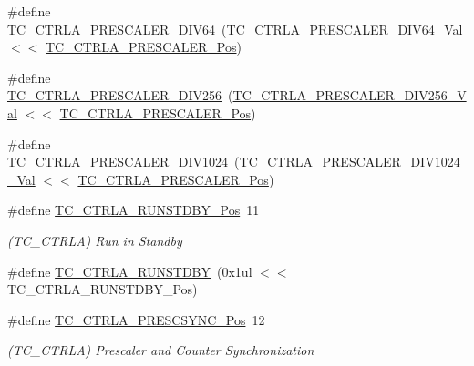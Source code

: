 \begin{DoxyCompactItemize}
\item 
\#define \mbox{\hyperlink{group___s_a_m_d21___t_c_gac90b5513f244124e999727b1380d40cc}{T\+C\+\_\+\+C\+T\+R\+L\+A\+\_\+\+P\+R\+E\+S\+C\+A\+L\+E\+R\+\_\+\+D\+I\+V64}}~(\mbox{\hyperlink{group___s_a_m_d21___t_c_ga0b0249d49985611866900d8e5f932543}{T\+C\+\_\+\+C\+T\+R\+L\+A\+\_\+\+P\+R\+E\+S\+C\+A\+L\+E\+R\+\_\+\+D\+I\+V64\+\_\+\+Val}}  $<$$<$ \mbox{\hyperlink{group___s_a_m_d21___t_c_ga99d3a0239aaa0aecd6d8bec41fd4ce05}{T\+C\+\_\+\+C\+T\+R\+L\+A\+\_\+\+P\+R\+E\+S\+C\+A\+L\+E\+R\+\_\+\+Pos}})
\item 
\#define \mbox{\hyperlink{group___s_a_m_d21___t_c_gab0b9cb13e0e2fd7136b258033cd1ffb6}{T\+C\+\_\+\+C\+T\+R\+L\+A\+\_\+\+P\+R\+E\+S\+C\+A\+L\+E\+R\+\_\+\+D\+I\+V256}}~(\mbox{\hyperlink{group___s_a_m_d21___t_c_gadb32efea52586bd45507d5988fa89452}{T\+C\+\_\+\+C\+T\+R\+L\+A\+\_\+\+P\+R\+E\+S\+C\+A\+L\+E\+R\+\_\+\+D\+I\+V256\+\_\+\+Val}} $<$$<$ \mbox{\hyperlink{group___s_a_m_d21___t_c_ga99d3a0239aaa0aecd6d8bec41fd4ce05}{T\+C\+\_\+\+C\+T\+R\+L\+A\+\_\+\+P\+R\+E\+S\+C\+A\+L\+E\+R\+\_\+\+Pos}})
\item 
\#define \mbox{\hyperlink{group___s_a_m_d21___t_c_ga64129a9b91628fd9ae8da421e9a5ba46}{T\+C\+\_\+\+C\+T\+R\+L\+A\+\_\+\+P\+R\+E\+S\+C\+A\+L\+E\+R\+\_\+\+D\+I\+V1024}}~(\mbox{\hyperlink{group___s_a_m_d21___t_c_ga4bf804edc81bb01e9fc5cc9c7b365d86}{T\+C\+\_\+\+C\+T\+R\+L\+A\+\_\+\+P\+R\+E\+S\+C\+A\+L\+E\+R\+\_\+\+D\+I\+V1024\+\_\+\+Val}} $<$$<$ \mbox{\hyperlink{group___s_a_m_d21___t_c_ga99d3a0239aaa0aecd6d8bec41fd4ce05}{T\+C\+\_\+\+C\+T\+R\+L\+A\+\_\+\+P\+R\+E\+S\+C\+A\+L\+E\+R\+\_\+\+Pos}})
\item 
\#define \mbox{\hyperlink{group___s_a_m_d21___t_c_gaa484fe3eae496075906d152ffbe64025}{T\+C\+\_\+\+C\+T\+R\+L\+A\+\_\+\+R\+U\+N\+S\+T\+D\+B\+Y\+\_\+\+Pos}}~11
\begin{DoxyCompactList}\small\item\em (T\+C\+\_\+\+C\+T\+R\+LA) Run in Standby \end{DoxyCompactList}\item 
\#define \mbox{\hyperlink{group___s_a_m_d21___t_c_gab15dadfa08a62289008d4a50972ab159}{T\+C\+\_\+\+C\+T\+R\+L\+A\+\_\+\+R\+U\+N\+S\+T\+D\+BY}}~(0x1ul $<$$<$ T\+C\+\_\+\+C\+T\+R\+L\+A\+\_\+\+R\+U\+N\+S\+T\+D\+B\+Y\+\_\+\+Pos)
\item 
\#define \mbox{\hyperlink{group___s_a_m_d21___t_c_ga9791c4a6d8cb12aa2b14d4fce3653c70}{T\+C\+\_\+\+C\+T\+R\+L\+A\+\_\+\+P\+R\+E\+S\+C\+S\+Y\+N\+C\+\_\+\+Pos}}~12
\begin{DoxyCompactList}\small\item\em (T\+C\+\_\+\+C\+T\+R\+LA) Prescaler and Counter Synchronization \end{DoxyCompactList}\item 

\end{DoxyCompactItemize}
